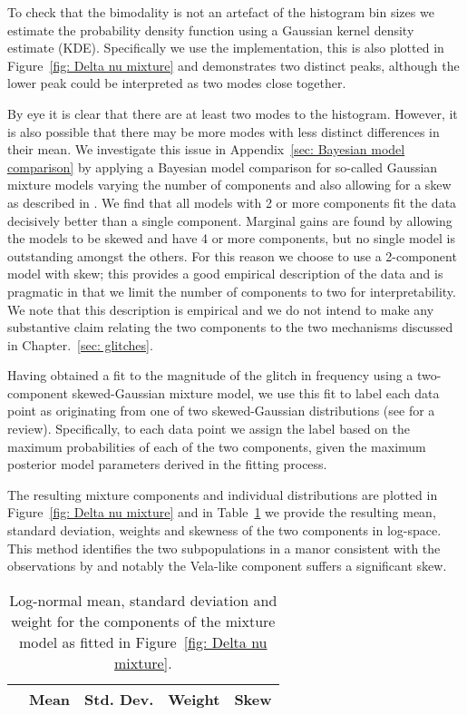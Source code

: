 \documentclass[../full_thesis/full_thesis.tex]{subfiles}
\newcommand{\thisdir}{../glitches_in_CGW}
\begin{document}
To check that the bimodality is not an artefact of the histogram bin sizes we
estimate the probability density function using a Gaussian kernel density
estimate (KDE). Specifically we use the \citet{Scipy} implementation, this is
also plotted in Figure~\ref{fig: Delta nu mixture} and demonstrates two distinct
peaks, although the lower peak could be interpreted as two modes close together.

By eye it is clear that there are at least two modes to the histogram. However,
it is also possible that there may be more modes with less distinct differences
in their mean. We investigate this issue in Appendix~\ref{sec: Bayesian model
comparison} by applying a Bayesian model comparison for so-called Gaussian
mixture models varying the number of components and also allowing for a skew as
described in \citet{Ohagan1976}.  We find that all models with 2 or more
components fit the data decisively better than a single component. Marginal
gains are found by allowing the models to be skewed and have 4 or more
components, but no single model is outstanding amongst the others. For this
reason we choose to use a 2-component model with skew; this provides a good
empirical description of the data and is pragmatic in that we limit the number
of components to two for interpretability. We note that this description is
empirical and we do not intend to make any substantive claim relating the two
components to the two mechanisms discussed in Chapter.~\ref{sec: glitches}.

Having obtained a fit to the magnitude of the glitch in frequency using a
two-component skewed-Gaussian mixture model, we use this fit to label
each data point as originating from one of two skewed-Gaussian distributions
(see \citet{gelman2013bayesian} for a review). Specifically, to each data point
we assign the label based on the maximum probabilities of each of the two
components, given the maximum posterior model parameters derived in the fitting
process.

The resulting mixture components and individual
distributions are plotted in Figure~\ref{fig: Delta nu mixture} and in
Table~\ref{tab: mixture components} we provide the resulting mean, standard
deviation, weights and skewness of the two components in log-space.
This method identifies the two subpopulations in a manor consistent with the
observations by \citet{Espinoza2011} and notably the Vela-like component suffers
a significant skew.

\begin{table}[htb]
\begin{tabular}{lcccc}
& Mean &Std. Dev. & Weight & Skew \\ \hline

\end{tabular}
\caption{Log-normal mean, standard deviation and weight for the components of
the mixture model as fitted in Figure~\ref{fig: Delta nu mixture}.}
\label{tab: mixture components}
\end{table}
\end{document}
